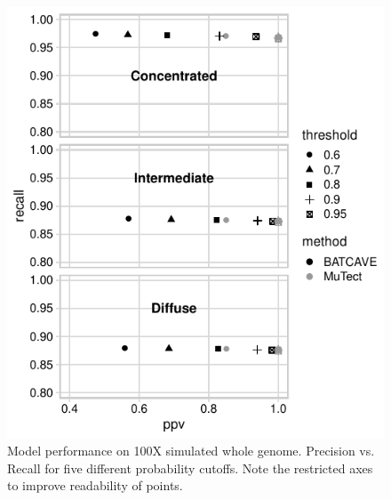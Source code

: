 \documentclass[a4,center,fleqn]{NAR}
\begin{document}
\clearpage
\begin{figure}
  \begin{center}
  \includegraphics{figures/ppv_wgs.pdf}
  \end{center}
  \caption{Model performance on 100X simulated whole genome. 
  Precision vs. Recall for five different probability cutoffs. 
  Note the restricted axes to improve readability of points.}
\label{NAR-ppv_wgs_fig}
\end{figure}
\end{document}
